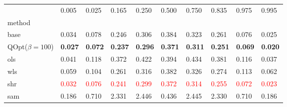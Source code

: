 \begin{tabular}{llllllllll}
\toprule
 & 0.005 & 0.025 & 0.165 & 0.250 & 0.500 & 0.750 & 0.835 & 0.975 & 0.995 \\
method &  &  &  &  &  &  &  &  &  \\
\midrule
base & 0.034 & 0.078 & 0.246 & 0.306 & 0.384 & 0.323 & 0.261 & 0.076 & 0.025 \\
\midrule
QOpt($\beta=100$) & \textbf{0.027} & \textbf{0.072} & \textbf{0.237} & \textbf{0.296} & \textbf{0.371} & \textbf{0.311} & \textbf{0.251} & \textbf{0.069} & \textbf{0.020} \\
ols & 0.041 & 0.118 & 0.372 & 0.422 & 0.394 & 0.434 & 0.381 & 0.116 & 0.037 \\
wls & 0.059 & 0.104 & 0.261 & 0.316 & 0.382 & 0.326 & 0.274 & 0.113 & 0.062 \\
shr & \textcolor{red}{0.032} & \textcolor{red}{0.076} & \textcolor{red}{0.241} & \textcolor{red}{0.299} & \textcolor{red}{0.372} & \textcolor{red}{0.314} & \textcolor{red}{0.255} & \textcolor{red}{0.072} & \textcolor{red}{0.023} \\
sam & 0.186 & 0.710 & 2.331 & 2.446 & 0.436 & 2.445 & 2.330 & 0.710 & 0.186 \\
\bottomrule
\end{tabular}
